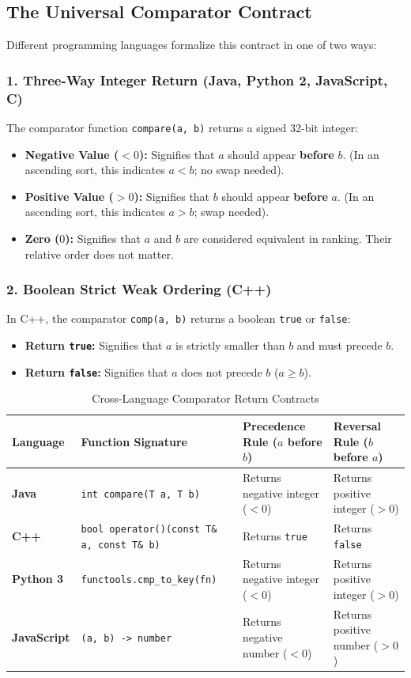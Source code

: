 \documentclass[10pt,journal,compsoc,onecolumn]{IEEEtran}
\begin{document}
\subsection{The Universal Comparator Contract}

Different programming languages formalize this contract in one of two ways:

\subsubsection{1. Three-Way Integer Return (Java, Python 2, JavaScript, C)}
The comparator function \texttt{compare(a, b)} returns a signed 32-bit integer:
\begin{itemize}
    \item \textbf{Negative Value ($< 0$):} Signifies that $a$ should appear \textbf{before} $b$. (In an ascending sort, this indicates $a < b$; no swap needed).
    \item \textbf{Positive Value ($> 0$):} Signifies that $b$ should appear \textbf{before} $a$. (In an ascending sort, this indicates $a > b$; swap needed).
    \item \textbf{Zero ($0$):} Signifies that $a$ and $b$ are considered equivalent in ranking. Their relative order does not matter.
\end{itemize}

\subsubsection{2. Boolean Strict Weak Ordering (C++)}
In C++, the comparator \texttt{comp(a, b)} returns a boolean \texttt{true} or \texttt{false}:
\begin{itemize}
    \item \textbf{Return \texttt{true}:} Signifies that $a$ is strictly smaller than $b$ and must precede $b$.
    \item \textbf{Return \texttt{false}:} Signifies that $a$ does not precede $b$ ($a \ge b$).
\end{itemize}

\begin{table}[h]
\centering
\caption{Cross-Language Comparator Return Contracts}
\label{tab:comparators}
\begin{tabular}{@{}llll@{}}
\toprule
\textbf{Language} & \textbf{Function Signature} & \textbf{Precedence Rule ($a$ before $b$)} & \textbf{Reversal Rule ($b$ before $a$)} \\ \midrule
\textbf{Java} & \texttt{int compare(T a, T b)} & Returns negative integer ($< 0$) & Returns positive integer ($> 0$) \\
\textbf{C++} & \texttt{bool operator()(const T\& a, const T\& b)} & Returns \texttt{true} & Returns \texttt{false} \\
\textbf{Python 3} & \texttt{functools.cmp\_to\_key(fn)} & Returns negative integer ($< 0$) & Returns positive integer ($> 0$) \\
\textbf{JavaScript} & \texttt{(a, b) -> number} & Returns negative number ($< 0$) & Returns positive number ($> 0$) \\ \bottomrule
\end{tabular}
\end{table}
\end{document}
